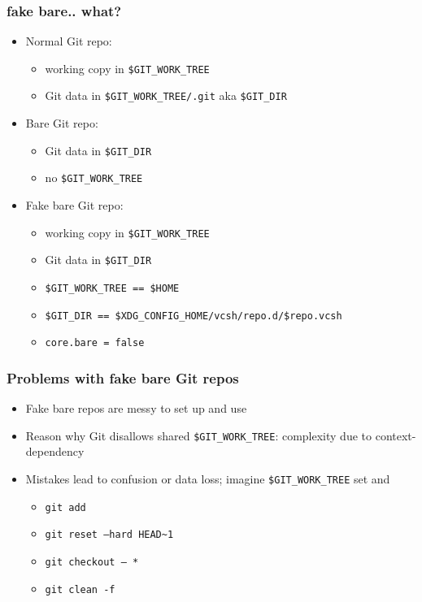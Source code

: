 \documentclass[t]{beamer}
\begin{document}
\begin{frame}
	\frametitle{fake bare.. what?}
	\begin{itemize}
		\item Normal Git repo:
		\begin{itemize}
			\item working copy in \texttt{\$GIT\_WORK\_TREE}
			\item Git data in \texttt{\$GIT\_WORK\_TREE/.git} aka \texttt{\$GIT\_DIR}
		\end{itemize}
		\item Bare Git repo:
		\begin{itemize}
			\item Git data in \texttt{\$GIT\_DIR}
			\item no  \texttt{\$GIT\_WORK\_TREE}
		\end{itemize}
		\item Fake bare Git repo:
		\begin{itemize}
			\item working copy in \texttt{\$GIT\_WORK\_TREE}
			\item Git data in \texttt{\$GIT\_DIR}
			\item \texttt{\$GIT\_WORK\_TREE == \$HOME}
			\item \texttt{\$GIT\_DIR == \$XDG\_CONFIG\_HOME/vcsh/repo.d/\$repo.vcsh}
			\item \texttt{core.bare = false}
		\end{itemize}
	\end{itemize}
\end{frame}

\begin{frame}
	\frametitle{Problems with fake bare Git repos}
	\begin{itemize}
		\item Fake bare repos are messy to set up and use
		\item Reason why Git disallows shared \texttt{\$GIT\_WORK\_TREE}: complexity due to context-dependency
		\item Mistakes lead to confusion or data loss; imagine \texttt{\$GIT\_WORK\_TREE} set and
		\begin{itemize}
			\item \texttt{git add}
			\item \texttt{git reset --hard HEAD\~{}1}
			\item \texttt{git checkout -- *}
			\item \texttt{git clean -f}
		\end{itemize}
	\end{itemize}
\end{frame}
\end{document}
